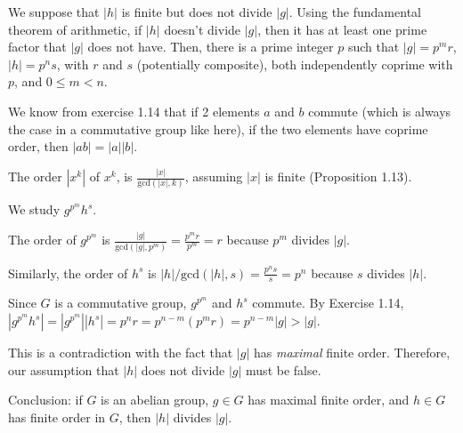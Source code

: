We suppose that $|h|$ is finite but does not divide $|g|$. Using the fundamental theorem of arithmetic, if $|h|$ doesn't divide $|g|$, then it has at least one prime factor that $|g|$ does not have. Then, there is a prime integer $p$ such that $|g| = p^m r$, $|h| = p^n s$, with $r$ and $s$ (potentially composite), both independently coprime with $p$, and $0 \leq m < n$.

We know from exercise 1.14 that if 2 elements $a$ and $b$ commute (which is always the case in a commutative group like here), if the two elements have coprime order, then $|ab| = |a||b|$.

The order $|x^k|$ of $x^k$, is $\frac{|x|}{\text{gcd}(|x|, k)}$, assuming $|x|$ is finite (Proposition 1.13).

We study $g^{p^m} h^s$. 

The order of $g^{p^m}$ is $\frac{|g|}{\text{gcd}(|g|, p^m)} = \frac{p^m r}{p^m} = r$ because $p^m$ divides $|g|$.

Similarly, the order of $h^s$ is $|h|/\text{gcd}(|h|, s) = \frac{p^n s}{s} = p^n$ because $s$ divides $|h|$.

Since $G$ is a commutative group, $g^{p^m}$ and $h^s$ commute. By Exercise 1.14, $|g^{p^m} h^s| = |g^{p^m}| |h^s| = p^n r = p^{n-m} (p^m r) = p^{n-m} |g| > |g|$.

This is a contradiction with the fact that $|g|$ has \textit{maximal} finite order. Therefore, our assumption that $|h|$ does not divide $|g|$ must be false.

Conclusion: if $G$ is an abelian group, $g \in G$ has maximal finite order, and $h \in G$ has finite order in $G$, then $|h|$ divides $|g|$.
